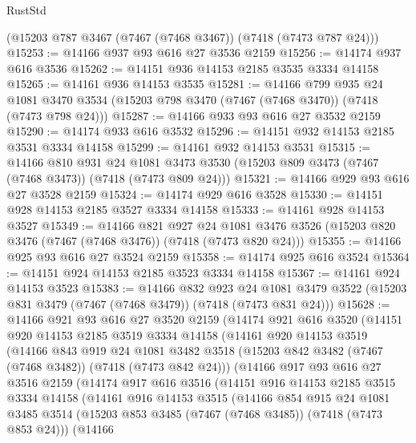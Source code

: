 \begin{lexlean}{RustStd}
\begin{coremodule}
    (@15203 @787 @3467 (@7467 (@7468 @3467)) (@7418 (@7473 @787 @24)))
@15253 := @14166 @937 @93 @616 @27 @3536 @2159
@15256 := @14174 @937 @616 @3536
@15262 := @14151 @936 @14153 @2185 @3535 @3334 @14158
@15265 := @14161 @936 @14153 @3535
@15281 := @14166
    @799
    @935
    @24
    @1081
    @3470
    @3534
    (@15203 @798 @3470 (@7467 (@7468 @3470)) (@7418 (@7473 @798 @24)))
@15287 := @14166 @933 @93 @616 @27 @3532 @2159
@15290 := @14174 @933 @616 @3532
@15296 := @14151 @932 @14153 @2185 @3531 @3334 @14158
@15299 := @14161 @932 @14153 @3531
@15315 := @14166
    @810
    @931
    @24
    @1081
    @3473
    @3530
    (@15203 @809 @3473 (@7467 (@7468 @3473)) (@7418 (@7473 @809 @24)))
@15321 := @14166 @929 @93 @616 @27 @3528 @2159
@15324 := @14174 @929 @616 @3528
@15330 := @14151 @928 @14153 @2185 @3527 @3334 @14158
@15333 := @14161 @928 @14153 @3527
@15349 := @14166
    @821
    @927
    @24
    @1081
    @3476
    @3526
    (@15203 @820 @3476 (@7467 (@7468 @3476)) (@7418 (@7473 @820 @24)))
@15355 := @14166 @925 @93 @616 @27 @3524 @2159
@15358 := @14174 @925 @616 @3524
@15364 := @14151 @924 @14153 @2185 @3523 @3334 @14158
@15367 := @14161 @924 @14153 @3523
@15383 := @14166
    @832
    @923
    @24
    @1081
    @3479
    @3522
    (@15203 @831 @3479 (@7467 (@7468 @3479)) (@7418 (@7473 @831 @24)))
@15628 := @14166
    @921
    @93
    @616
    @27
    @3520
    @2159
    (@14174
      @921
      @616
      @3520
      (@14151
        @920
        @14153
        @2185
        @3519
        @3334
        @14158
        (@14161
          @920
          @14153
          @3519
          (@14166
            @843
            @919
            @24
            @1081
            @3482
            @3518
            (@15203 @842 @3482 (@7467 (@7468 @3482)) (@7418 (@7473 @842 @24)))
            (@14166
              @917
              @93
              @616
              @27
              @3516
              @2159
              (@14174
                @917
                @616
                @3516
                (@14151
                  @916
                  @14153
                  @2185
                  @3515
                  @3334
                  @14158
                  (@14161
                    @916
                    @14153
                    @3515
                    (@14166
                      @854
                      @915
                      @24
                      @1081
                      @3485
                      @3514
                      (@15203 @853 @3485 (@7467 (@7468 @3485)) (@7418 (@7473 @853 @24)))
                      (@14166

\end{coremodule}
\end{lexlean}
